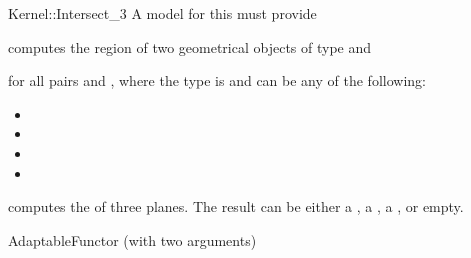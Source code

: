 \begin{ccRefFunctionObjectConcept}{Kernel::Intersect_3}
A model for this must provide


{computes the  region of two geometrical objects of type 
 and }

for all pairs  and , where
the type  is  and 
 can be any of the following:
\begin{itemize}
\item {}
\item {}
\item {}
\item {}
\end{itemize}

{computes the  of three planes.  The result
can be either a , a , a
, or empty.}

\ccRefines
AdaptableFunctor (with two arguments)

\ccSeeAlso
{}\\

\end{ccRefFunctionObjectConcept}
